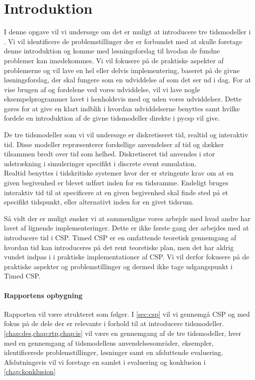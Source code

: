 \chapter{Introduktion}
I denne opgave vil vi undersøge om det er muligt at introducere tre tidsmodeller i \pycsp. Vi vil identificere de problemstillinger der er forbundet med at skulle foretage denne introduktion og komme med løsningsforslag til hvodan de fundne problemer kan imødekommes. Vi vil fokusere på de praktiske aspekter af problemerne og vil lave en  hel eller delvis implementering, baseret på de givne løsningsforslag, der skal fungere som en udviddelse af \pycsp som det ser ud i dag. For at vise brugen af og fordelene ved vores udviddelse, vil vi lave nogle eksempelprogrammer lavet i \pycsp henholdsvis med og uden vores udviddelser. Dette gøres for at give en klart indblik i hvordan udviddelserne benyttes samt hvilke fordele en introduktion af de givne tidsmodeller direkte i pycsp vil give. 

De tre tidsmodeller som vi vil undersøge er diskretiseret tid, realtid og interaktiv tid. Disse modeller repræsenterer forskellige anvendelser af tid og dækker tilsammen bredt over tid som helhed. Diskretiseret tid anvendes i stor udstrækning i simuleringer specifikt i discrete event sumulation. \\
Realtid benyttes i tidskritiske systemer hvor der er stringente krav om at en given begivenhed er blevet udført inden for en tidsramme. Endeligt bruges interaktiv tid til at specificere at en given begivenhed skal finde sted på et specifikt tidspunkt, eller alternativt inden for en givet tidsrum. 

Så vidt der er muligt ønsker vi at sammenligne vores arbejde med hvad andre har lavet af lignende implementeringer. Dette er ikke første gang der arbejdes med at introducere tid i CSP. Timed CSP er en omfattende teoretisk gennemgang af hvordan tid kan introduceres på det rent teoretiske plan, men det har aldrig vundet indpas i i praktiske implementationer af CSP. Vi vil derfor fokusere på de praktiske aspekter og problemstillinger og dermed ikke tage udgangspunkt i Timed CSP. 

\subsubsection{Rapportens opbygning}
Rapporten vil være strukteret som følger. I \cref{sec:csp} vil vi gennemgå CSP og \pycsp med fokus på de dele der er relevante i forhold til at introducere tidsmodeller. \cref{chap:des,chap:rtp,chap:is} vil være en gennemgang af de tre tidsmodeller, hver med en gennemgang af tidsmodellens anvendelsesområder, eksempler, identificerede problemstillinger, løsninger samt en afsluttende evaluering. Afslutningsvis vil vi foretage en samlet i evaluering og konklusion i \cref{chap:konklusion}







